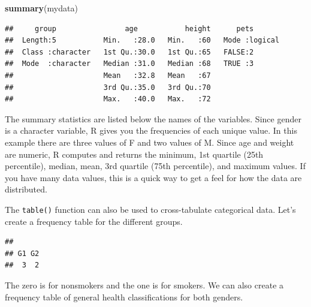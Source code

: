 \documentclass[
]{book}
\newenvironment{Shaded}{\begin{snugshade}}{\end{snugshade}}
\newcommand{\KeywordTok}[1]{\textcolor[rgb]{0.13,0.29,0.53}{\textbf{#1}}}
\newcommand{\NormalTok}[1]{#1}
\newcommand{\OperatorTok}[1]{\textcolor[rgb]{0.81,0.36,0.00}{\textbf{#1}}}
\begin{document}
\begin{Shaded}
\begin{Highlighting}[]
\KeywordTok{summary}\NormalTok{(mydata)}
\end{Highlighting}
\end{Shaded}

\begin{verbatim}
##     group                age           height      pets        
##  Length:5           Min.   :28.0   Min.   :60   Mode :logical  
##  Class :character   1st Qu.:30.0   1st Qu.:65   FALSE:2        
##  Mode  :character   Median :31.0   Median :68   TRUE :3        
##                     Mean   :32.8   Mean   :67                  
##                     3rd Qu.:35.0   3rd Qu.:70                  
##                     Max.   :40.0   Max.   :72
\end{verbatim}

The summary statistics are listed below the names of the variables. Since gender is a character variable, R gives you the frequencies of each unique value. In this example there are three values of F and two values of M. Since age and weight are numeric, R computes and returns the minimum, 1st quartile (25th percentile), median, mean, 3rd quartile (75th percentile), and maximum values. If you have many data values, this is a quick way to get a feel for how the data are distributed.

The \texttt{table()} function can also be used to cross-tabulate categorical data. Let's create a frequency table for the different groups.

\begin{Shaded}
\end{Shaded}

\begin{verbatim}
## 
## G1 G2 
##  3  2
\end{verbatim}

The zero is for nonsmokers and the one is for smokers. We can also create a frequency table of general health classifications for both genders.

\begin{Shaded}
\end{Shaded}
\end{document}
